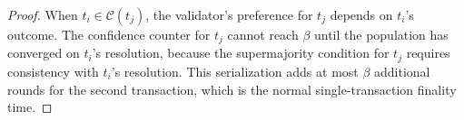 \begin{proof}
When $t_i \in \mathcal{C}(t_j)$, the validator's preference for $t_j$ depends on $t_i$'s
outcome. The confidence counter for $t_j$ cannot reach $\beta$ until the population
has converged on $t_i$'s resolution, because the supermajority condition for $t_j$
requires consistency with $t_i$'s resolution. This serialization adds at most $\beta$
additional rounds for the second transaction, which is the normal single-transaction
finality time.
\end{proof}

